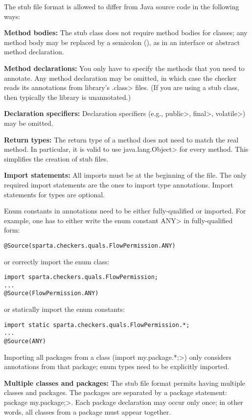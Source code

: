 The stub file format is allowed to differ from Java source code in the
following ways:
\begin{description}

\item{\textbf{Method bodies:}}
  The stub class does not require method bodies for classes; any method
  body may be replaced by a semicolon (\code{;}), as in an interface or
  abstract method declaration.

\item{\textbf{Method declarations:}}
  You only have to specify the methods that you need to annotate.
  Any method declaration may be omitted, in which case the checker reads
  its annotations from library's \<.class> files.  (If you are using a stub class, then
  typically the library is unannotated.)

\item{\textbf{Declaration specifiers:}}
  Declaration specifiers (e.g., \<public>, \<final>, \<volatile>)
  may be omitted.

\item{\textbf{Return types:}}
  The return type of a method does not need to match the real method.
  In particular, it is valid to use \<java.lang.Object> for every method.
  This simplifies the creation of stub files.

\item{\textbf{Import statements:}}
  All imports must be at the beginning of the file.
  The only required import statements are the ones to import type
  annotations.  Import statements for types are optional.

  Enum constants in annotations need to be either fully-qualified
  or imported.
  For example, one has to either write the enum constant \<ANY> in
  fully-qualified form:

\begin{Verbatim}
@Source(sparta.checkers.quals.FlowPermission.ANY)
\end{Verbatim}

\noindent
or correctly import the enum class:

\begin{Verbatim}
import sparta.checkers.quals.FlowPermission;
...
@Source(FlowPermission.ANY)
\end{Verbatim}

\noindent
or statically import the enum constants:

\begin{Verbatim}
import static sparta.checkers.quals.FlowPermission.*;
...
@Source(ANY)
\end{Verbatim}

  Importing all packages from a class (\<import my.package.*;>) only
  considers annotations from that package; enum types need to be
  explicitly imported.

\item{\textbf{Multiple classes and packages:}}
  The stub file format permits having multiple classes and packages.
  The packages are separated by a package statement:
  \<package my.package;>.  Each package declaration may occur only once; in
  other words, all classes from a package must appear together.

\end{description}
